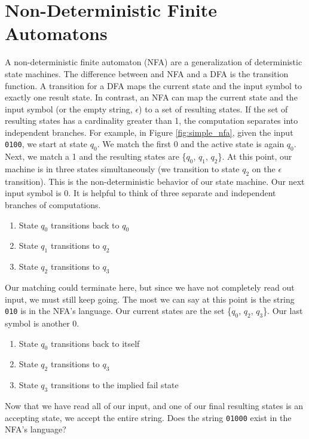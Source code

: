 \section*{Non-Deterministic Finite Automatons}
A non-deterministic finite automaton (NFA) are a generalization of deterministic state machines.
The difference between and NFA and a DFA is the transition function.
A transition for a DFA maps the current state and the input symbol to exactly one result state.
In contrast, an NFA can map the current state and the input symbol (or the empty string, $\epsilon$) to a set of resulting states.
If the set of resulting states has a cardinality greater than 1, the computation separates into independent branches.
For example, in Figure \ref{fig:simple_nfa}, given the input \texttt{0100}, we start at state $q_0$.  We match the first 0 and the active state is again $q_0$.  Next, we match a 1 and the resulting states are \{$q_0$, $q_1$, $q_2$\}.
At this point, our machine is in three states simultaneously (we transition to state $q_2$ on the $\epsilon$ transition).
This is the non-deterministic behavior of our state machine.
Our next input symbol is 0.
It is helpful to think of three separate and independent branches of computations.
\begin{enumerate}
\item State $q_0$ transitions back to $q_0$
\item State $q_1$ transitions to $q_2$
\item State $q_2$ transitions to $q_3$
\end{enumerate}
Our matching could terminate here, but since we have not completely read out input, we must still keep going.  The most we can say at this point is the string \texttt{010} is in the NFA's language.  Our current states are the set \{$q_0$, $q_2$, $q_3$\}.
Our last symbol is another 0.
\begin{enumerate}
\item State $q_0$ transitions back to itself
\item State $q_2$ transitions to $q_3$
\item State $q_3$ transitions to the implied fail state
\end{enumerate}
Now that we have read all of our input, and one of our final resulting states is an accepting state, we accept the entire string.  Does the string \texttt{01000} exist in the NFA's language?

